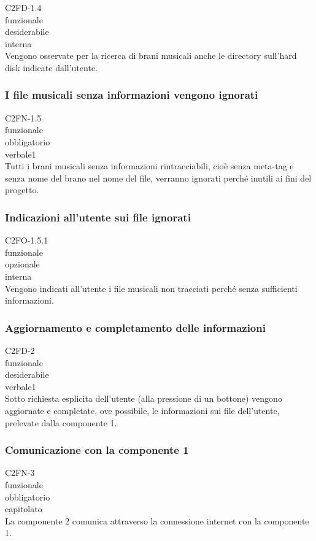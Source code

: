  C2FD-1.4 \\
 funzionale \\
 desiderabile \\
 interna \\
Vengono osservate per la ricerca di brani musicali anche le directory sull'hard
disk indicate dall'utente.

\subsubsection*{I file musicali senza informazioni vengono ignorati}
 C2FN-1.5 \\
 funzionale \\
 obbligatorio \\
 verbale1 \\
Tutti i brani musicali senza informazioni rintracciabili, cio\`e senza meta-tag e
senza nome del brano nel nome del file, verranno ignorati perch\'e inutili ai fini
del progetto.

\subsubsection*{Indicazioni all'utente sui file ignorati}
 C2FO-1.5.1 \\
 funzionale \\
 opzionale \\
 interna \\
Vengono indicati all'utente i file musicali non tracciati perch\'e senza
sufficienti informazioni.

\subsubsection*{Aggiornamento e completamento delle informazioni}
 C2FD-2 \\
 funzionale \\
 desiderabile \\
 verbale1 \\
Sotto richiesta esplicita dell'utente (alla pressione di un bottone) vengono
aggiornate e completate, ove possibile, le informazioni sui file dell'utente,
prelevate dalla componente 1.

\subsubsection*{Comunicazione con la componente 1}
 C2FN-3 \\
 funzionale \\
 obbligatorio \\
 capitolato \\
La componente 2 comunica attraverso la connessione internet con la componente 1.

